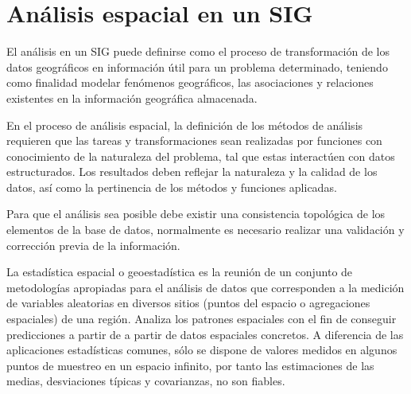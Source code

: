 \section{Análisis espacial en un SIG}
\label{sec:cap2-analisis-espacial-sig}

El análisis en un SIG puede definirse como el proceso de transformación de los datos geográficos en información
útil para un problema determinado, teniendo como finalidad modelar fenómenos geográficos, las asociaciones
y relaciones existentes en la información geográfica almacenada.

En el proceso de análisis espacial, la definición de los métodos de análisis requieren que las tareas y
transformaciones sean realizadas por funciones con conocimiento de la naturaleza del problema, tal que estas
interactúen con datos estructurados. Los resultados deben reflejar la naturaleza y la calidad de los datos, así
como la pertinencia de los métodos y funciones aplicadas.

Para que el análisis sea posible debe existir una consistencia topológica de los elementos de la base de datos,
normalmente es necesario realizar una validación y corrección previa de la información.

La estadística espacial o geoestadística es la reunión de un conjunto de metodologías apropiadas para el análisis
de datos que corresponden a la medición de variables aleatorias en diversos sitios (puntos del espacio o
agregaciones espaciales) de una región\cite{rgeraldoGeoestasistica}. Analiza los patrones espaciales con el fin de
conseguir predicciones a partir de a partir de datos espaciales concretos. A diferencia de las aplicaciones
estadísticas comunes, sólo se dispone de valores medidos en algunos puntos de muestreo en un espacio infinito, 
por tanto las estimaciones de las medias, desviaciones típicas y covarianzas, no son fiables.

